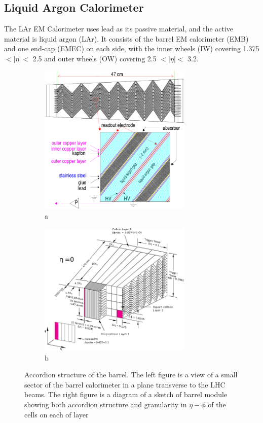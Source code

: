 \subsection{Liquid Argon Calorimeter}
\par The LAr EM Calorimeter uses lead as its passive material, and the active material is liquid argon (LAr). 
It consists of the barrel EM calorimeter (EMB) and one end-cap (EMEC) on each side, with the inner wheels (IW) covering 1.375 $< |\eta| <$ 2.5 and outer wheels 
(OW) covering 2.5 $< |\eta| <$ 3.2.
\begin{figure}[htbp!]
\begin{subfigure}{.5\textwidth}
 \centering
 \includegraphics[width=0.8\textwidth]{chapters/c4/figures/lar-layers}
 \caption{a}
 \label{fig:lar1}
\end{subfigure}%
\begin{subfigure}{.5\textwidth}
 \centering
 \includegraphics[width=0.8\textwidth]{chapters/c4/figures/lar}
 \caption{b}
 \label{fig:lar2}
\end{subfigure}
 \caption{
Accordion structure of the barrel. The left figure is a view of a small
 sector of the barrel calorimeter in a plane transverse to the LHC beams.
 The right figure is a diagram of a sketch of barrel module showing both accordion structure and granularity in $\eta - \phi$ of the cells on each of layer}
\label{fig:pixel}
\end{figure}


